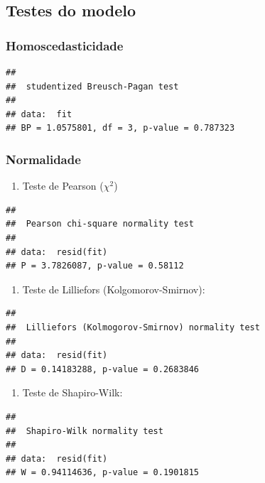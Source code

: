 \documentclass[]{article}
\providecommand{\tightlist}{%
  \setlength{\itemsep}{0pt}\setlength{\parskip}{0pt}}
\begin{document}
\subsection{Testes do modelo}\label{testes-do-modelo}

\subsubsection{Homoscedasticidade}\label{homoscedasticidade}

\begin{verbatim}
## 
##  studentized Breusch-Pagan test
## 
## data:  fit
## BP = 1.0575801, df = 3, p-value = 0.787323
\end{verbatim}

\subsubsection{Normalidade}\label{normalidade}

\begin{enumerate}
\def\labelenumi{\alph{enumi}.}
\tightlist
\item
  Teste de Pearson (\(\chi^2\))
\end{enumerate}

\begin{verbatim}
## 
##  Pearson chi-square normality test
## 
## data:  resid(fit)
## P = 3.7826087, p-value = 0.58112
\end{verbatim}

\begin{enumerate}
\def\labelenumi{\alph{enumi}.}
\setcounter{enumi}{1}
\tightlist
\item
  Teste de Lilliefors (Kolgomorov-Smirnov):
\end{enumerate}

\begin{verbatim}
## 
##  Lilliefors (Kolmogorov-Smirnov) normality test
## 
## data:  resid(fit)
## D = 0.14183288, p-value = 0.2683846
\end{verbatim}

\begin{enumerate}
\def\labelenumi{\alph{enumi}.}
\setcounter{enumi}{2}
\tightlist
\item
  Teste de Shapiro-Wilk:
\end{enumerate}

\begin{verbatim}
## 
##  Shapiro-Wilk normality test
## 
## data:  resid(fit)
## W = 0.94114636, p-value = 0.1901815
\end{verbatim}
\end{document}

